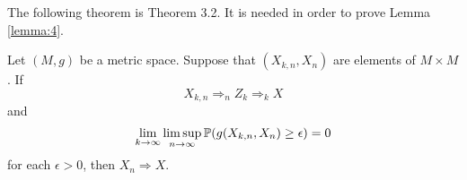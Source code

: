 The following theorem is \cite{billingsley1999convergence} Theorem 3.2. It is needed in order to prove Lemma \ref{lemma:4}.
\begin{thm} \label{theorem billingsley double convergence}
    Let $(M, g)$ be a metric space. Suppose that $(X_{k, n}, X_n)$ are elements of $M \times M$. If
    \begin{equation} \label{for lemma 4: double weak convergence}
        X_{k, n} \Rightarrow_n Z_k \Rightarrow_k X 
    \end{equation}
    and
    \begin{equation} \label{for lemma 4: kind of convergence in probability}
        \lim\limits_{k \to \infty} \limsup\limits_{n \to \infty} \mathbb{P}(g(X_{k, n}, X_n) \geq \epsilon) = 0
    \end{equation}
    for each $\epsilon > 0$, then $X_n \Rightarrow X$.
\end{thm}


